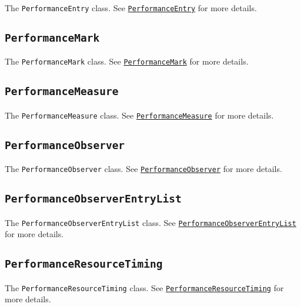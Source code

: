 The \texttt{PerformanceEntry} class. See
\href{perf_hooks.md\#class-performanceentry}{\texttt{PerformanceEntry}}
for more details.

\subsection{\texorpdfstring{\texttt{PerformanceMark}}{PerformanceMark}}\label{performancemark}

The \texttt{PerformanceMark} class. See
\href{perf_hooks.md\#class-performancemark}{\texttt{PerformanceMark}}
for more details.

\subsection{\texorpdfstring{\texttt{PerformanceMeasure}}{PerformanceMeasure}}\label{performancemeasure}

The \texttt{PerformanceMeasure} class. See
\href{perf_hooks.md\#class-performancemeasure}{\texttt{PerformanceMeasure}}
for more details.

\subsection{\texorpdfstring{\texttt{PerformanceObserver}}{PerformanceObserver}}\label{performanceobserver}

The \texttt{PerformanceObserver} class. See
\href{perf_hooks.md\#class-performanceobserver}{\texttt{PerformanceObserver}}
for more details.

\subsection{\texorpdfstring{\texttt{PerformanceObserverEntryList}}{PerformanceObserverEntryList}}\label{performanceobserverentrylist}

The \texttt{PerformanceObserverEntryList} class. See
\href{perf_hooks.md\#class-performanceobserverentrylist}{\texttt{PerformanceObserverEntryList}}
for more details.

\subsection{\texorpdfstring{\texttt{PerformanceResourceTiming}}{PerformanceResourceTiming}}\label{performanceresourcetiming}

The \texttt{PerformanceResourceTiming} class. See
\href{perf_hooks.md\#class-performanceresourcetiming}{\texttt{PerformanceResourceTiming}}
for more details.

